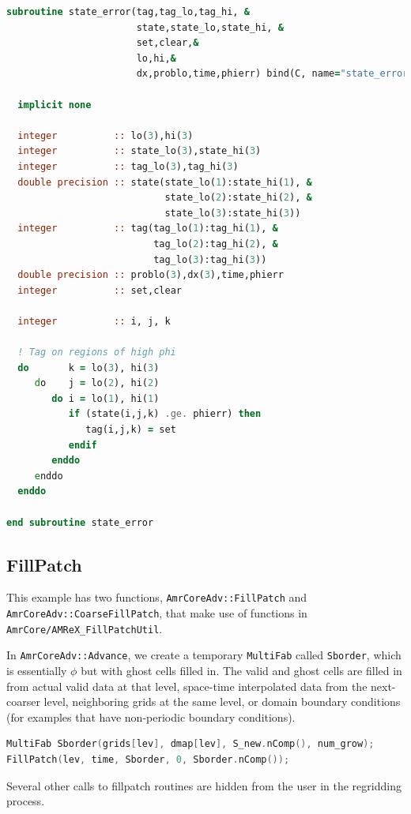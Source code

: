 \begin{lstlisting}[language=fortran]
subroutine state_error(tag,tag_lo,tag_hi, &
                       state,state_lo,state_hi, &
                       set,clear,&
                       lo,hi,&
                       dx,problo,time,phierr) bind(C, name="state_error")

  implicit none
  
  integer          :: lo(3),hi(3)
  integer          :: state_lo(3),state_hi(3)
  integer          :: tag_lo(3),tag_hi(3)
  double precision :: state(state_lo(1):state_hi(1), &
                            state_lo(2):state_hi(2), &
                            state_lo(3):state_hi(3))
  integer          :: tag(tag_lo(1):tag_hi(1), &
                          tag_lo(2):tag_hi(2), &
                          tag_lo(3):tag_hi(3))
  double precision :: problo(3),dx(3),time,phierr
  integer          :: set,clear

  integer          :: i, j, k

  ! Tag on regions of high phi
  do       k = lo(3), hi(3)
     do    j = lo(2), hi(2)
        do i = lo(1), hi(1)
           if (state(i,j,k) .ge. phierr) then
              tag(i,j,k) = set
           endif
        enddo
     enddo
  enddo

end subroutine state_error
\end{lstlisting}

\subsection{FillPatch}
This example has two functions, {\tt AmrCoreAdv::FillPatch} and {\tt AmrCoreAdv::CoarseFillPatch},
that make use of functions in {\tt AmrCore/AMReX\_FillPatchUtil}.

In {\tt AmrCoreAdv::Advance}, we create a temporary {\tt MultiFab} called {\tt Sborder}, which
is essentially $\phi$ but with ghost cells filled in.  The valid and ghost cells are filled in from
actual valid data at that level, space-time interpolated data from the next-coarser level, 
neighboring grids at the same level, or domain boundary conditions 
(for examples that have non-periodic boundary conditions).
\begin{lstlisting}[language=cpp]
MultiFab Sborder(grids[lev], dmap[lev], S_new.nComp(), num_grow);
FillPatch(lev, time, Sborder, 0, Sborder.nComp());
\end{lstlisting}
Several other calls to fillpatch routines are hidden from the user in the regridding process.
